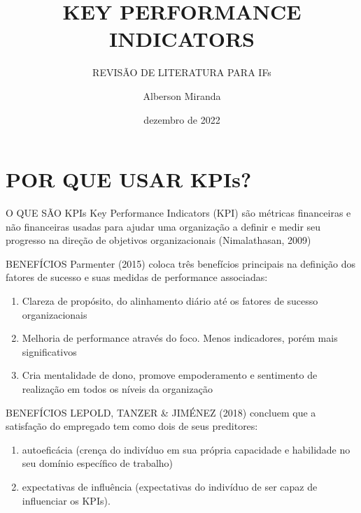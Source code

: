 \documentclass[
  ignorenonframetext,
]{beamer}
\title{KEY PERFORMANCE INDICATORS}
\subtitle{REVISÃO DE LITERATURA PARA IFs}
\author{Alberson Miranda}
\date{dezembro de 2022}
\providecommand{\tightlist}{%
  \setlength{\itemsep}{0pt}\setlength{\parskip}{0pt}}\usepackage{longtable,booktabs,array}
\begin{document}
\frame{\titlepage}
\ifdefined\Shaded\renewenvironment{Shaded}{\begin{tcolorbox}[interior hidden, borderline west={3pt}{0pt}{shadecolor}, sharp corners, frame hidden, enhanced, boxrule=0pt, breakable]}{\end{tcolorbox}}\fi

\hypertarget{por-que-usar-kpis}{%
\section{POR QUE USAR KPIs?}\label{por-que-usar-kpis}}

\begin{frame}{O QUE SÃO KPIs}
\protect\hypertarget{o-que-suxe3o-kpis}{}
Key Performance Indicators (KPI) são métricas financeiras e não
financeiras usadas para ajudar uma organização a definir e medir seu
progresso na direção de objetivos organizacionais (Nimalathasan, 2009)
\end{frame}

\begin{frame}{BENEFÍCIOS}
\protect\hypertarget{benefuxedcios}{}
Parmenter (2015) coloca três benefícios principais na definição dos
fatores de sucesso e suas medidas de performance associadas:

\begin{enumerate}
\tightlist
\item
  Clareza de propósito, do alinhamento diário até os fatores de sucesso
  organizacionais
\item
  Melhoria de performance através do foco. Menos indicadores, porém mais
  significativos
\item
  Cria mentalidade de dono, promove empoderamento e sentimento de
  realização em todos os níveis da organização
\end{enumerate}
\end{frame}

\begin{frame}{BENEFÍCIOS}
\protect\hypertarget{benefuxedcios-1}{}
LEPOLD, TANZER \& JIMÉNEZ (2018) concluem que a satisfação do empregado
tem como dois de seus preditores:

\begin{enumerate}
\tightlist
\item
  autoeficácia (crença do indivíduo em sua própria capacidade e
  habilidade no seu domínio específico de trabalho)
\item
  expectativas de influência (expectativas do indivíduo de ser capaz de
  influenciar os KPIs).
\end{enumerate}
\end{frame}
\end{document}
